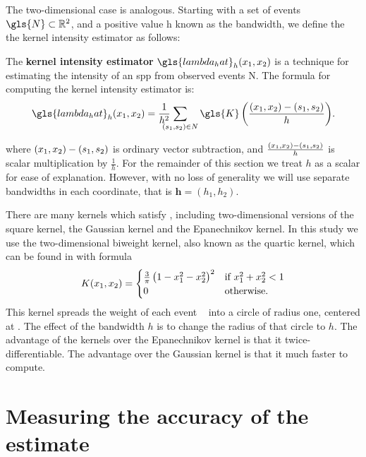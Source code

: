 The two-dimensional case is analogous.
Starting with a set of \glspl{event} $\gls{N} \subset \RS$,
and a positive value \gls{h} known as the bandwidth,
we define the the \gls{kernel intensity estimator} as follows:
\begin{defn}
    \label{defn:lambda_hat}
    The \textbf{\gls{kernel intensity estimator}} $\gls{lambda_hat}_h \xvec$
    is a technique for estimating the \gls{intensity} of an \gls{spp}
    from observed \glspl{event} \gls{N}.
    The formula for computing the \gls{kernel intensity estimator} is:
    \begin{equation}
        \label{eq:lambda_hat}
        \gls{lambda_hat}_h \xvec%
            = \sumS{\gls{K}\left( \frac{\xvec-(s_1, s_2)}{h} \right)} \text{.}%
    \end{equation}
\end{defn}
where $(x_1, x_2)-(s_1, s_2)$ is ordinary vector subtraction,
and $\frac{(x_1, x_2)-(s_1, s_2)}{h}$ is scalar multiplication by $\frac{1}{h}$.
For the remainder of this section we treat $h$ as a scalar for ease of explanation.
However, with no loss of generality we will use separate bandwidths in each coordinate,
that is $\mathbf{h}=(h_1, h_2)$.

There are many kernels which satisfy ,
including two-dimensional versions of the square kernel, the Gaussian kernel and the Epanechnikov kernel.
In this study we use the two-dimensional biweight kernel,
also known as the quartic kernel,
which can be found in \citet{silverman1986density} with formula
\begin{equation}
    \label{eq:biweightkernel2d}
    K \xvec =%
    \begin{cases}%
        \frac{3}{\pi}\left( 1 - x_1^2 - x_2^2 \right)^2 & \text{if}~x_1^2+x_2^2<1 \\%
        0 & \text{otherwise.}%
    \end{cases}%
\end{equation}
This kernel spreads the weight of each event \xvec~ into a circle of radius one, centered at \xvec.
The effect of the bandwidth $h$ is to change the radius of that circle to $h$.
The advantage of the kernels over the Epanechnikov kernel is that it twice-differentiable.
The advantage over the Gaussian kernel is that it much faster to compute.

\section{Measuring the accuracy of the estimate}
\label{sec:theory:accuracy}

